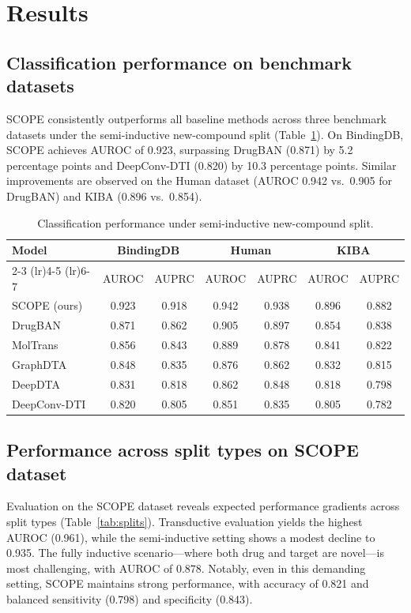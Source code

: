 \documentclass[11pt]{article}
\begin{document}
\section{Results}

\subsection{Classification performance on benchmark datasets}

SCOPE consistently outperforms all baseline methods across three benchmark datasets under the semi-inductive new-compound split (Table~\ref{tab:benchmark}). On BindingDB, SCOPE achieves AUROC of 0.923, surpassing DrugBAN (0.871) by 5.2 percentage points and DeepConv-DTI (0.820) by 10.3 percentage points. Similar improvements are observed on the Human dataset (AUROC 0.942 vs.\ 0.905 for DrugBAN) and KIBA (0.896 vs.\ 0.854).

\begin{table}[htbp]
\centering
\caption{Classification performance under semi-inductive new-compound split.}
\label{tab:benchmark}
\begin{tabular}{@{}lcccccc@{}}
\toprule
\multirow{2}{*}{Model} & \multicolumn{2}{c}{BindingDB} & \multicolumn{2}{c}{Human} & \multicolumn{2}{c}{KIBA} \\
\cmidrule(lr){2-3} \cmidrule(lr){4-5} \cmidrule(lr){6-7}
 & AUROC & AUPRC & AUROC & AUPRC & AUROC & AUPRC \\
\midrule
SCOPE (ours)  & 0.923 & 0.918 & 0.942 & 0.938 & 0.896 & 0.882 \\
DrugBAN       & 0.871 & 0.862 & 0.905 & 0.897 & 0.854 & 0.838 \\
MolTrans      & 0.856 & 0.843 & 0.889 & 0.878 & 0.841 & 0.822 \\
GraphDTA      & 0.848 & 0.835 & 0.876 & 0.862 & 0.832 & 0.815 \\
DeepDTA       & 0.831 & 0.818 & 0.862 & 0.848 & 0.818 & 0.798 \\
DeepConv-DTI  & 0.820 & 0.805 & 0.851 & 0.835 & 0.805 & 0.782 \\
\bottomrule
\end{tabular}
\end{table}

\subsection{Performance across split types on SCOPE dataset}

Evaluation on the SCOPE dataset reveals expected performance gradients across split types (Table~\ref{tab:splits}). Transductive evaluation yields the highest AUROC (0.961), while the semi-inductive setting shows a modest decline to 0.935. The fully inductive scenario---where both drug and target are novel---is most challenging, with AUROC of 0.878. Notably, even in this demanding setting, SCOPE maintains strong performance, with accuracy of 0.821 and balanced sensitivity (0.798) and specificity (0.843).
\end{document}
